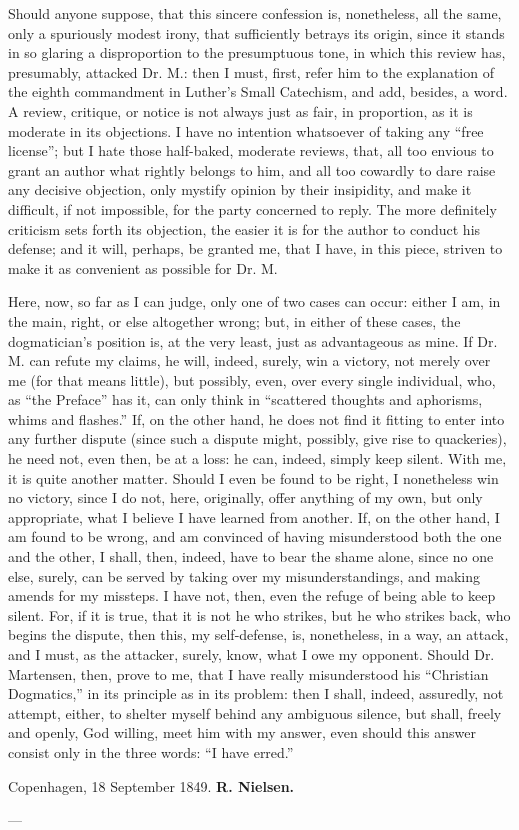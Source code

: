 \documentclass[12pt]{book}
\begin{document}
Should anyone suppose, that this sincere confession is, nonetheless, all the same, only a spuriously modest irony, that sufficiently betrays its origin, since it stands in so glaring a disproportion to the presumptuous tone, in which this review has, presumably, attacked Dr. M.: then I must, first, refer him to the explanation of the eighth commandment in Luther's Small Catechism, and add, besides, a word. A review, critique, or notice is not always just as fair, in proportion, as it is moderate in its objections. I have no intention whatsoever of taking any ``free license''; but I hate those half-baked, moderate reviews, that, all too envious to grant an author what rightly belongs to him, and all too cowardly to dare raise any decisive objection, only mystify opinion by their insipidity, and make it difficult, if not impossible, for the party concerned to reply.
The more definitely criticism sets forth its objection, the easier it is for the author to conduct his defense; and it will, perhaps, be granted me, that I have, in this piece, striven to make it as convenient as possible for Dr. M.

Here, now, so far as I can judge, only one of two cases can occur: either I am, in the main, right, or else altogether wrong; but, in either of these cases, the dogmatician's position is, at the very least, just as advantageous as mine. If Dr. M. can refute my claims, he will, indeed, surely, win a victory, not merely over me (for that means little), but possibly, even, over every single individual, who, as ``the Preface'' has it, can only think in ``scattered thoughts and aphorisms, whims and flashes.'' If, on the other hand, he does not find it fitting to enter into any further dispute (since such a dispute might, possibly, give rise to quackeries), he need not, even then, be at a loss: he can, indeed, simply keep silent. With me, it is quite another matter. Should I even be found to be right, I nonetheless win no victory, since I do not, here, originally, offer anything of my own, but only appropriate, what I believe I have learned from another. If, on the other hand, I am found to be wrong, and am convinced of having misunderstood both the one and the other, I shall, then, indeed, have to bear the shame alone, since no one else, surely, can be served by taking over my misunderstandings, and making amends for my missteps. I have not, then, even the refuge of being able to keep silent. For, if it is true, that it is not he who strikes, but he who strikes back, who begins the dispute, then
this, my self-defense, is, nonetheless, in a way, an attack, and I must, as the attacker, surely, know, what I owe my opponent. Should Dr. Martensen, then, prove to me, that I have really misunderstood his ``Christian Dogmatics,'' in its principle as in its problem: then I shall, indeed, assuredly, not attempt, either, to shelter myself behind any ambiguous silence, but shall, freely and openly, God willing, meet him with my answer, even should this answer consist only in the three words: ``I have erred.''

\bigskip
\noindent Copenhagen, 18 September 1849.
\hfill {\bfseries R. Nielsen.}\hspace{2em}

\begin{center}---\end{center}
\end{document}
